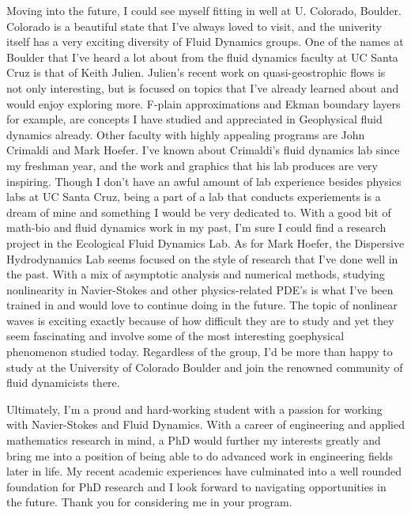 \documentclass{article}
\begin{document}
Moving into the future, I could see myself fitting in well at U. Colorado, Boulder. Colorado is a beautiful state that I've always loved to visit, and the univerity itself has a very exciting diversity of Fluid Dynamics groups. One of the names at Boulder that I've heard a lot about from the fluid dynamics faculty at UC Santa Cruz is that of Keith Julien. Julien's recent work on quasi-geostrophic flows is not only interesting, but is focused on topics that I've already learned about and would enjoy exploring more. F-plain approximations and Ekman boundary layers for example, are concepts I have studied and appreciated in Geophysical fluid dynamics already. Other faculty with highly appealing programs are John Crimaldi and Mark Hoefer. I've known about Crimaldi's fluid dynamics lab since my freshman year, and the work and graphics that his lab produces are very inspiring. Though I don't have an awful amount of lab experience besides physics labs at UC Santa Cruz, being a part of a lab that conducts experiements is a dream of mine and something I would be very dedicated to. With a good bit of math-bio and fluid dynamics work in my past, I'm sure I could find a research project in the Ecological Fluid Dynamics Lab. As for Mark Hoefer, the Dispersive Hydrodynamics Lab seems focused on the style of research that I've done well in the past. With a mix of asymptotic analysis and numerical methods, studying nonlinearity in Navier-Stokes and other physics-related PDE's is what I've been trained in and would love to continue doing in the future. The topic of nonlinear waves is exciting exactly because of how difficult they are to study and yet they seem fascinating and involve some of the most interesting goephysical phenomenon studied today. Regardless of the group, I'd be more than happy to study at the University of Colorado Boulder and join the renowned community of fluid dynamicists there. 

Ultimately, I'm a proud and hard-working student with a passion for working with Navier-Stokes and Fluid Dynamics. With a career of engineering and applied mathematics research in mind, a PhD would further my interests greatly and bring me into a position of being able to do advanced work in engineering fields later in life. My recent academic experiences have culminated into a well rounded foundation for PhD research and I look forward to navigating opportunities in the future. Thank you for considering me in your program. 

\end{document}
